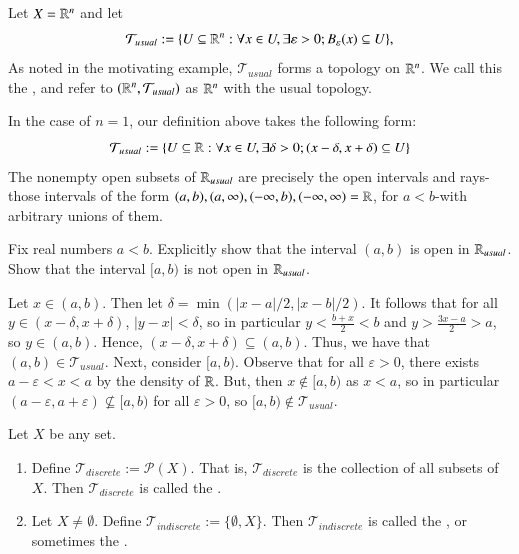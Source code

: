 \documentclass[12pt, a4paper, oneside, openright, titlepage]{book}
\begin{document}
\begin{eg}
    Let $X = \mathbb R^n$ and let \begin{equation*}
        \mathcal{T}_{usual} := \{U\subseteq \mathbb R^n:\forall x \in U,\exists\varepsilon > 0; B_{\varepsilon}(x) \subseteq U\},
    \end{equation*}
    As noted in the motivating example, $\mathcal{T}_{usual}$ forms a topology on $\mathbb R^n$. We call this the , and refer to $(\mathbb R^n,\mathcal{T}_{usual})$ as $\mathbb R^n$ with the usual topology. 

    In the case of $n = 1$, our definition above takes the following form: \begin{equation*}
        \mathcal{T}_{usual} := \{U \subseteq \mathbb R:\forall x\in U,\exists \delta >0; (x-\delta,x+\delta)\subseteq U\}
    \end{equation*}
    The nonempty open subsets of $\mathbb R_{usual}$ are precisely the open intervals and rays\--those intervals of the form $(a,b), (a,\infty),(-\infty,b), (-\infty,\infty) = \mathbb R$, for $a < b$\--with arbitrary unions of them.
\end{eg}

\begin{xca}
    Fix real numbers $a<b$. Explicitly show that the interval $(a,b)$ is open in $\mathbb R_{usual}$. Show that the interval $[a,b)$ is not open in $\mathbb R_{usual}$.
\end{xca}
\begin{cust}[Solution]
    Let $x \in (a,b)$. Then let $\delta = \min(|x-a|/2,|x-b|/2)$. It follows that for all $y \in (x-\delta, x+\delta)$, $|y-x| < \delta$, so in particular $y < \frac{b+x}{2} < b$ and $y > \frac{3x-a}{2} > a$, so $y \in (a,b)$. Hence, $(x-\delta,x+\delta) \subseteq (a,b)$. Thus, we have that $(a,b) \in \mathcal{T}_{usual}$. Next, consider $[a,b)$. Observe that for all $\varepsilon > 0$, there exists $a-\varepsilon < x < a$ by the density of $\mathbb R$. But, then $x \notin [a,b)$ as $x < a$, so in particular $(a-\varepsilon,a+\varepsilon) \nsubseteq [a,b)$ for all $\varepsilon > 0$, so $[a,b) \notin \mathcal{T}_{usual}$.
\end{cust}

\begin{eg}
    Let $X$ be any set. \begin{enumerate}
        \item Define $\mathcal{T}_{discrete} := \mathcal{P}(X)$. That is, $\mathcal{T}_{discrete}$ is the collection of all subsets of $X$. Then $\mathcal{T}_{discrete}$ is called the .
        \item Let $X \neq \emptyset$. Define $\mathcal{T}_{indiscrete} :=\{\emptyset,X\}$. Then $\mathcal{T}_{indiscrete}$ is called the , or sometimes the .
    \end{enumerate}
\end{eg}
\end{document}
